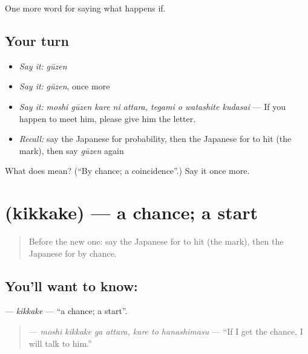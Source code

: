 \begin{grammarlens}[title={What you've built}]
One more word for saying what happens if.
\end{grammarlens}

\subsection*{Your turn}
\begin{itemize}
\raggedright
  \item \emph{Say it:} \emph{gūzen}
  \item \emph{Say it:} \emph{gūzen}, once more
  \item \emph{Say it:} \emph{moshi gūzen kare ni attara, tegami o watashite kudasai} — If you happen to meet him, please give him the letter.
  \item \emph{Recall:} say the Japanese for probability, then the Japanese for to hit (the mark), then say \emph{gūzen} again
\end{itemize}

\begin{tcolorbox}[breakable,colback=teal!4,colframe=teal!35!black,title={Before you move on}]
What does  mean? (\textquotedblleft{}By chance; a coincidence\textquotedblright{}.) Say it once more.
\end{tcolorbox}
\section[\texorpdfstring{\ja{きっかけ} (kikkake)}{きっかけ (kikkake)}]{ (kikkake) — a chance; a start}

\label{lesson:JA-C510-kikkake}



\begin{quote}
Before the new one: say the Japanese for to hit (the mark), then the Japanese for by chance.
\end{quote}

\subsection*{You'll want to know: }
\textbf{} — \emph{kikkake} — \textquotedblleft{}a chance; a start\textquotedblright{}.

\begin{quote}
\textbf{   } — \emph{moshi kikkake ga attara, kare to hanashimasu} — \textquotedblleft{}If I get the chance, I will talk to him.\textquotedblright{}
\end{quote}

